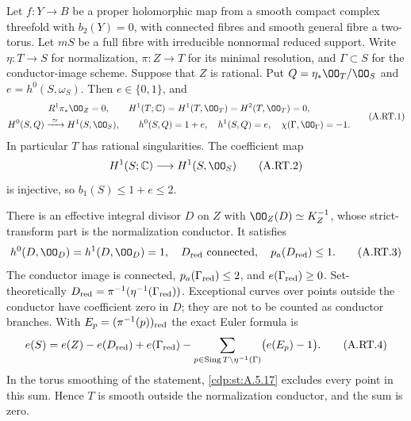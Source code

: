 
\begin{proposition}\label{cdp:st:A.5.16}
Let $f:Y\to B$ be a proper holomorphic map from a smooth compact
complex threefold with $b_2(Y)=0$, with connected fibres and smooth
general fibre a two-torus. Let $mS$ be a full fibre with irreducible
nonnormal reduced support. Write $\eta:T\to S$ for normalization,
$\pi:Z\to T$ for its minimal resolution, and $\Gamma\subset S$
for the conductor-image scheme. Suppose that $Z$ is rational.
Put $Q=\eta_*\OO_T/\OO_S$ and $e=h^0(S,\omega_S)$.
Then $e\in\{0,1\}$, and
\[
\begin{gathered}
 R^1\pi_*\OO_Z=0,\qquad
 H^1(T;\mathbb C)=H^1(T,\OO_T)=H^2(T,\OO_T)=0,\\
 H^0(S,Q)\xrightarrow{\ \simeq\ }H^1(S,\OO_S),\qquad
 h^0(S,Q)=1+e,\quad h^1(S,Q)=e,\quad
 \chi(\Gamma,\OO_\Gamma)=-1.
\end{gathered}
\tag{A.RT.1}\label{cdp:eq:A.RT.1}
\]
In particular $T$ has rational singularities. The coefficient map
\[
 H^1(S;\mathbb C)\longrightarrow H^1(S,\OO_S)
\tag{A.RT.2}\label{cdp:eq:A.RT.2}
\]
is injective, so $b_1(S)\le1+e\le2$.

There is an effective integral divisor $D$ on $Z$ with
$\OO_Z(D)\simeq K_Z^{-1}$, whose strict-transform part is the
normalization conductor. It satisfies
\[
 h^0(D,\OO_D)=h^1(D,\OO_D)=1,
 \quad D_{\rm red}\text{ connected},
 \quad p_a(D_{\rm red})\le1.
\tag{A.RT.3}\label{cdp:eq:A.RT.3}
\]
The conductor image is connected,
$p_a(\Gamma_{\rm red})\le2$, and
$e(\Gamma_{\rm red})\ge0$. Set-theoretically
$D_{\rm red}=\pi^{-1}(\eta^{-1}(\Gamma_{\rm red}))$.
Exceptional curves over points outside the conductor have
coefficient zero in $D$; they are not to be counted as conductor
branches. With $E_p=(\pi^{-1}(p))_{\rm red}$ the exact Euler
formula is
\[
 e(S)=e(Z)-e(D_{\rm red})+e(\Gamma_{\rm red})
       -\sum_{p\in\operatorname{Sing}T\setminus\eta^{-1}(\Gamma)}
                  \bigl(e(E_p)-1\bigr).
\tag{A.RT.4}\label{cdp:eq:A.RT.4}
\]
In the torus smoothing of the statement, \ref{cdp:st:A.5.17} excludes
every point in this sum. Hence $T$ is smooth outside the
normalization conductor, and the sum is zero.
\end{proposition}
